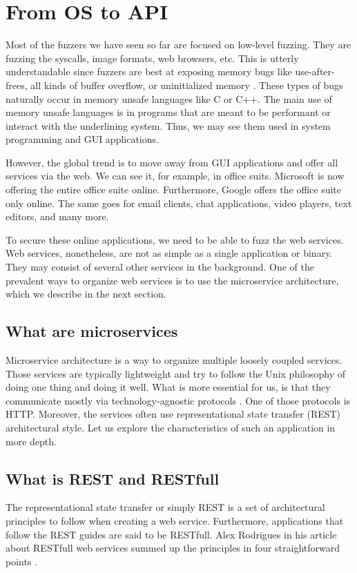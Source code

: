 \chapter{From OS to API}
Most of the fuzzers we have seen so far are focused on low-level fuzzing. They are fuzzing the syscalls, image formats, web browsers, etc. This is utterly understandable since fuzzers are best at exposing memory bugs like use-after-frees, all kinds of buffer overflow, or uninitialized memory \cite{chang2017oss}. These types of bugs naturally occur in memory unsafe languages like C or C++. The main use of memory unsafe languages is in programs that are meant to be performant or interact with the underlining system. Thus, we may see them used in system programming and GUI applications.

However, the global trend is to move away from GUI applications and offer all services via the web. We can see it, for example, in office suits. Microsoft is now offering the entire office suite online. Furthermore, Google offers the office suite only online. The same goes for email clients, chat applications, video players, text editors, and many more.

To secure these online applications, we need to be able to fuzz the web services. Web services, nonetheless, are not as simple as a single application or binary. They may consist of several other services in the background. One of the prevalent ways to organize web services is to use the microservice architecture, which we describe in the next section.

\section{What are microservices}
Microservice architecture is a way to organize multiple loosely coupled services. Those services are typically lightweight and try to follow the Unix philosophy of doing one thing and doing it well. What is more essential for us, is that they communicate mostly via technology-agnostic protocols \cite{nadareishvili2016microservice}. One of those protocols is HTTP. Moreover, the services often use representational state transfer (REST) architectural style. Let us explore the characteristics of such an application in more depth.

\section{What is REST and RESTfull}
The representational state transfer or simply REST is a set of architectural principles to follow when creating a web service. Furthermore, applications that follow the REST guides are said to be RESTfull. Alex Rodrigues in his article about RESTfull web services summed up the principles in four straightforward points \cite{rodriguez2008restful}.


